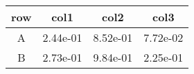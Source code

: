 \begin{tabular}{cccc}
\toprule
row&col1&col2&col3\tabularnewline
\midrule
A&2.44e-01&8.52e-01&7.72e-02\tabularnewline
B&2.73e-01&9.84e-01&2.25e-01\tabularnewline
\bottomrule
\end{tabular}
